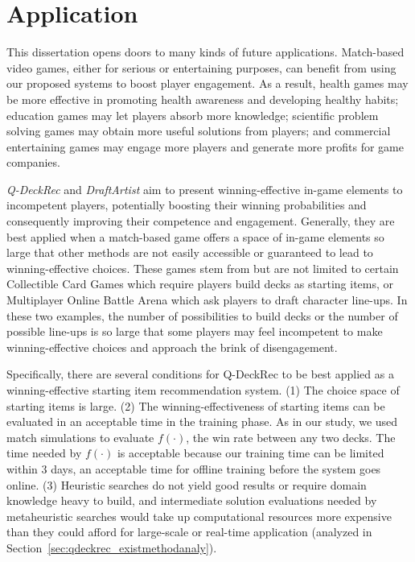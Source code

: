 \chapter{Application} %

\label{chapter:application} 

This dissertation opens doors to many kinds of future applications. Match-based video games, either for serious or entertaining purposes, can benefit from using our proposed systems to boost player engagement. As a result, health games may be more effective in promoting health awareness and developing healthy habits; education games may let players absorb more knowledge; scientific problem solving games may obtain more useful solutions from players; and commercial entertaining games may engage more players and generate more profits for game companies.  

\textit{Q-DeckRec} and \textit{DraftArtist} aim to present winning-effective in-game elements to incompetent players, potentially boosting their winning probabilities and consequently improving their competence and engagement. Generally, they are best applied when a match-based game offers a space of in-game elements so large that other methods are not easily accessible or guaranteed to lead to winning-effective choices. These games stem from but are not limited to certain Collectible Card Games which require players build decks as starting items, or Multiplayer Online Battle Arena which ask players to draft character line-ups. In these two examples, the number of possibilities to build decks or the number of possible line-ups is so large that some players may feel incompetent to make winning-effective choices and approach the brink of disengagement. 

Specifically, there are several conditions for Q-DeckRec to be best applied as a winning-effective starting item recommendation system. (1) The choice space of starting items is large. (2) The winning-effectiveness of starting items can be evaluated in an acceptable time in the training phase. As in our study, we used match simulations to evaluate $f(\cdot)$, the win rate between any two decks. The time needed by $f(\cdot)$ is acceptable because our training time can be limited within 3 days, an acceptable time for offline training before the system goes online. (3) Heuristic searches do not yield good results or require domain knowledge heavy to build, and intermediate solution evaluations needed by metaheuristic searches would take up computational resources more expensive than they could afford for large-scale or real-time application (analyzed in Section~\ref{sec:qdeckrec_existmethodanaly}).

